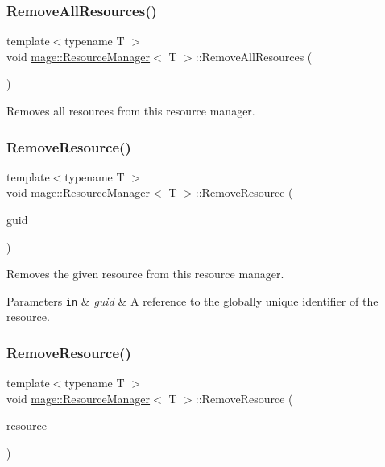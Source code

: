 \subsubsection{\texorpdfstring{Remove\+All\+Resources()}{RemoveAllResources()}}
{\footnotesize\ttfamily template$<$typename T $>$ \\
void \hyperlink{classmage_1_1_resource_manager}{mage\+::\+Resource\+Manager}$<$ T $>$\+::Remove\+All\+Resources (\begin{DoxyParamCaption}{ }\end{DoxyParamCaption})}

Removes all resources from this resource manager. \hypertarget{classmage_1_1_resource_manager_acc3b157c8cc46fbe516a0802a5c26028}{}\label{classmage_1_1_resource_manager_acc3b157c8cc46fbe516a0802a5c26028} 
\subsubsection{\texorpdfstring{Remove\+Resource()}{RemoveResource()}\hspace{0.1cm}{\footnotesize\ttfamily [1/2]}}
{\footnotesize\ttfamily template$<$typename T $>$ \\
void \hyperlink{classmage_1_1_resource_manager}{mage\+::\+Resource\+Manager}$<$ T $>$\+::Remove\+Resource (\begin{DoxyParamCaption}\item[{const wstring \&}]{guid }\end{DoxyParamCaption})}

Removes the given resource from this resource manager.


\begin{DoxyParams}[1]{Parameters}
\mbox{\tt in}  & {\em guid} & A reference to the globally unique identifier of the resource. \\
\hline
\end{DoxyParams}
\hypertarget{classmage_1_1_resource_manager_ac557e5047590d0403291557c88966574}{}\label{classmage_1_1_resource_manager_ac557e5047590d0403291557c88966574} 
\subsubsection{\texorpdfstring{Remove\+Resource()}{RemoveResource()}\hspace{0.1cm}{\footnotesize\ttfamily [2/2]}}
{\footnotesize\ttfamily template$<$typename T $>$ \\
void \hyperlink{classmage_1_1_resource_manager}{mage\+::\+Resource\+Manager}$<$ T $>$\+::Remove\+Resource (\begin{DoxyParamCaption}\item[{\hyperlink{namespacemage_a1e01ae66713838a7a67d30e44c67703e}{Shared\+Ptr}$<$ T $>$}]{resource }\end{DoxyParamCaption})}

